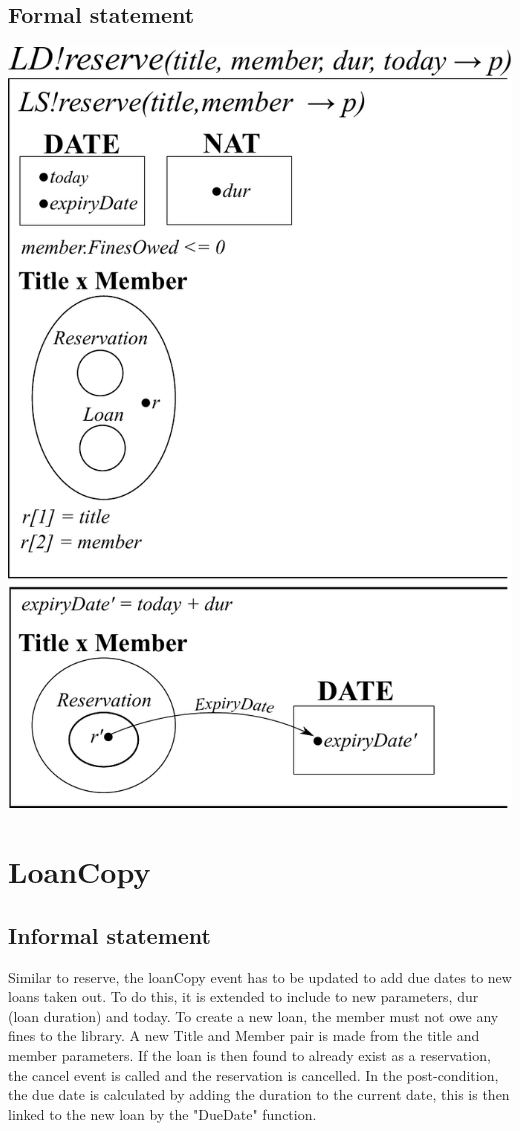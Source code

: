 \documentclass[]{report}
\begin{document}
\subsection{Formal statement}
\begin{center}
	\includegraphics[scale=0.75]{reserve.pdf}
\end{center}
\newpage
\section{LoanCopy}
\subsection{Informal statement}
Similar to reserve, the loanCopy event has to be updated to add due dates to new loans taken out. To do this, it is extended to include to new parameters, dur (loan duration) and today. To create a new loan, the member must not owe any fines to the library. A new Title and Member pair is made from the title and member parameters. If the loan is then found to already exist as a reservation, the cancel event is called and the reservation is cancelled. In the post-condition, the due date is calculated by adding the duration to the current date, this is then linked to the new loan by the "DueDate" function.
\end{document}
